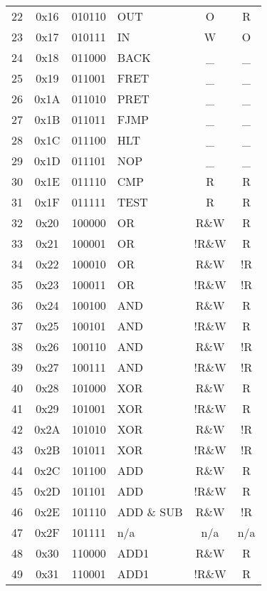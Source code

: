 \documentclass[oneside, a4paper]{memoir}
\begin{document}
\begin{center}
\begin{longtable}{ccclcc}
22 & 0x16 & 010110 & OUT             & O     & R   \\
23 & 0x17 & 010111 & IN              & W     & O   \\
24 & 0x18 & 011000 & BACK            & \_    & \_  \\
25 & 0x19 & 011001 & FRET            & \_    & \_  \\
26 & 0x1A & 011010 & PRET            & \_    & \_  \\
27 & 0x1B & 011011 & FJMP            & \_    & \_  \\
28 & 0x1C & 011100 & HLT             & \_    & \_  \\
29 & 0x1D & 011101 & NOP             & \_    & \_  \\
30 & 0x1E & 011110 & CMP             & R     & R   \\
31 & 0x1F & 011111 & TEST            & R     & R   \\
32 & 0x20 & 100000 & OR              & R\&W  & R   \\
33 & 0x21 & 100001 & OR              & !R\&W & R   \\
34 & 0x22 & 100010 & OR              & R\&W  & !R  \\
35 & 0x23 & 100011 & OR              & !R\&W & !R  \\
36 & 0x24 & 100100 & AND             & R\&W  & R   \\
37 & 0x25 & 100101 & AND             & !R\&W & R   \\
38 & 0x26 & 100110 & AND             & R\&W  & !R  \\
39 & 0x27 & 100111 & AND             & !R\&W & !R  \\
40 & 0x28 & 101000 & XOR             & R\&W  & R   \\
41 & 0x29 & 101001 & XOR             & !R\&W & R   \\
42 & 0x2A & 101010 & XOR             & R\&W  & !R  \\
43 & 0x2B & 101011 & XOR             & !R\&W & !R  \\
44 & 0x2C & 101100 & ADD             & R\&W  & R   \\
45 & 0x2D & 101101 & ADD             & !R\&W & R   \\
46 & 0x2E & 101110 & ADD   \& SUB    & R\&W  & !R  \\
47 & 0x2F & 101111 & n/a             & n/a   & n/a \\
48 & 0x30 & 110000 & ADD1            & R\&W  & R   \\
49 & 0x31 & 110001 & ADD1            & !R\&W & R   \\

\end{longtable}
\end{center}
\end{document}
